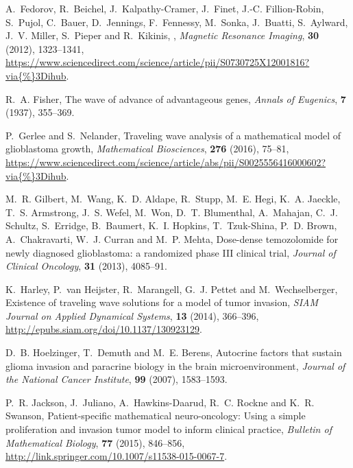 \documentclass{aims}
\numberwithin{equation}{section}
\begin{document}
\begin{thebibliography}{10}
\newblock A.~Fedorov, R.~Beichel, J.~Kalpathy-Cramer, J.~Finet, J.-C.
  Fillion-Robin, S.~Pujol, C.~Bauer, D.~Jennings, F.~Fennessy, M.~Sonka,
  J.~Buatti, S.~Aylward, J.~V. Miller, S.~Pieper and R.~Kikinis,
,
\newblock \emph{Magnetic Resonance Imaging}, \textbf{30} (2012), 1323--1341,
\newblock
  \urlprefix\url{https://www.sciencedirect.com/science/article/pii/S0730725X12001816?via{\%}3Dihub}.

\newblock R.~A. Fisher,
\newblock The wave of advance of advantageous genes,
\newblock \emph{Annals of Eugenics}, \textbf{7} (1937), 355--369.

\newblock P.~Gerlee and S.~Nelander,
\newblock Traveling wave analysis of a mathematical model of glioblastoma
  growth,
\newblock \emph{Mathematical Biosciences}, \textbf{276} (2016), 75--81,
\newblock
  \urlprefix\url{https://www.sciencedirect.com/science/article/abs/pii/S0025556416000602?via{\%}3Dihub}.

\newblock M.~R. Gilbert, M.~Wang, K.~D. Aldape, R.~Stupp, M.~E. Hegi, K.~A.
  Jaeckle, T.~S. Armstrong, J.~S. Wefel, M.~Won, D.~T. Blumenthal, A.~Mahajan,
  C.~J. Schultz, S.~Erridge, B.~Baumert, K.~I. Hopkins, T.~Tzuk-Shina, P.~D.
  Brown, A.~Chakravarti, W.~J. Curran and M.~P. Mehta,
\newblock Dose-dense temozolomide for newly diagnosed glioblastoma: a
  randomized phase {III} clinical trial,
\newblock \emph{Journal of Clinical Oncology}, \textbf{31} (2013), 4085--91.

\newblock K.~Harley, P.~van Heijster, R.~Marangell, G.~J. Pettet and
  M.~Wechselberger,
\newblock Existence of traveling wave solutions for a model of tumor invasion,
\newblock \emph{SIAM Journal on Applied Dynamical Systems}, \textbf{13} (2014),
  366--396,
\newblock \urlprefix\url{http://epubs.siam.org/doi/10.1137/130923129}.

\newblock D.~B. Hoelzinger, T.~Demuth and M.~E. Berens,
\newblock Autocrine factors that sustain glioma invasion and paracrine biology
  in the brain microenvironment,
\newblock \emph{Journal of the National Cancer Institute}, \textbf{99} (2007),
  1583--1593.

\newblock P.~R. Jackson, J.~Juliano, A.~Hawkins-Daarud, R.~C. Rockne and K.~R.
  Swanson,
\newblock Patient-specific mathematical neuro-oncology: Using a simple
  proliferation and invasion tumor model to inform clinical practice,
\newblock \emph{Bulletin of Mathematical Biology}, \textbf{77} (2015),
  846--856,
\newblock \urlprefix\url{http://link.springer.com/10.1007/s11538-015-0067-7}.


\end{thebibliography}
\end{document}
